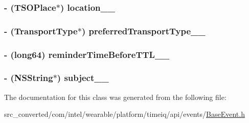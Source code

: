 \subsubsection[{location\+\_\+\+\_\+}]{\setlength{\rightskip}{0pt plus 5cm}-\/ ({\bf T\+S\+O\+Place}$\ast$) location\+\_\+\+\_\+}\label{interface_base_event___base_event_builder_a55905b025d81ae9d311245a928f2540f}
\hypertarget{interface_base_event___base_event_builder_af04f5589c9d88f57e6b17807b4dafa64}{}
\subsubsection[{preferred\+Transport\+Type\+\_\+\+\_\+}]{\setlength{\rightskip}{0pt plus 5cm}-\/ (Transport\+Type$\ast$) preferred\+Transport\+Type\+\_\+\+\_\+}\label{interface_base_event___base_event_builder_af04f5589c9d88f57e6b17807b4dafa64}
\hypertarget{interface_base_event___base_event_builder_aa564be1f9fcf028ced1ed7f0c763177a}{}
\subsubsection[{reminder\+Time\+Before\+T\+T\+L\+\_\+\+\_\+}]{\setlength{\rightskip}{0pt plus 5cm}-\/ (long64) reminder\+Time\+Before\+T\+T\+L\+\_\+\+\_\+}\label{interface_base_event___base_event_builder_aa564be1f9fcf028ced1ed7f0c763177a}
\hypertarget{interface_base_event___base_event_builder_a822ac0d667b96e331b26688b658d8b69}{}
\subsubsection[{subject\+\_\+\+\_\+}]{\setlength{\rightskip}{0pt plus 5cm}-\/ (N\+S\+String$\ast$) subject\+\_\+\+\_\+}\label{interface_base_event___base_event_builder_a822ac0d667b96e331b26688b658d8b69}


The documentation for this class was generated from the following file\+:\begin{DoxyCompactItemize}
\item 
src\+\_\+converted/com/intel/wearable/platform/timeiq/api/events/\hyperlink{_base_event_8h}{Base\+Event.\+h}\end{DoxyCompactItemize}
